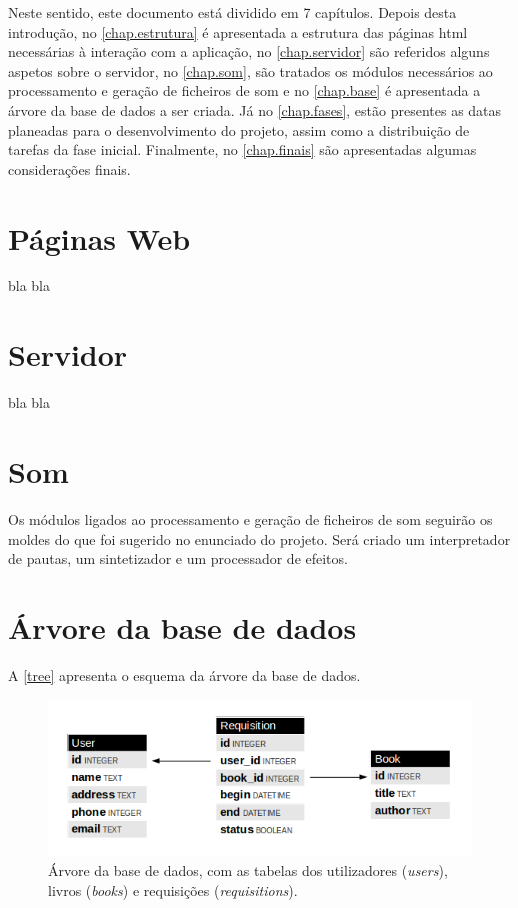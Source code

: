 \documentclass{report}
\begin{document}
Neste sentido, este documento está dividido em 7 capítulos. Depois desta introdução, no \autoref{chap.estrutura} é apresentada a estrutura das páginas \ac{html} necessárias à interação com a aplicação, no \autoref{chap.servidor} são referidos alguns aspetos sobre o servidor, no \autoref{chap.som}, são tratados os módulos necessários ao processamento e geração de ficheiros de som e no \autoref{chap.base} é apresentada a árvore da base de dados a ser criada. Já no \autoref{chap.fases}, estão presentes as datas planeadas para o desenvolvimento do projeto, assim como a distribuição de tarefas da fase inicial. Finalmente, no \autoref{chap.finais} são apresentadas algumas considerações finais.

\chapter{Páginas Web}
\label{chap.estrutura}

bla bla

\chapter{Servidor}
\label{chap.servidor}

bla bla

\chapter{Som}
\label{chap.som}

Os módulos ligados ao processamento e geração de ficheiros de som seguirão os moldes do que foi sugerido no enunciado do projeto. Será criado um interpretador de pautas, um sintetizador e um processador de efeitos.

\chapter{Árvore da base de dados}
\label{chap.base}

A \autoref{tree} apresenta o esquema da árvore da base de dados.

\begin{figure}[htp]
\centering
\includegraphics[width=\textwidth]{images/tree.png}
\caption{Árvore da base de dados, com as tabelas dos utilizadores (\emph{users}), livros (\emph{books}) e requisições (\emph{requisitions}).}
\label{tree}
\end{figure}
\end{document}
